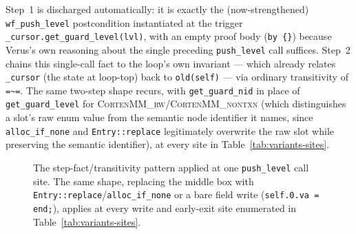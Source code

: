 \documentclass[10pt]{article}
\newcommand{\corten}[1]{\textsc{CortenMM\_#1}}
\newcommand{\vfn}[1]{\texttt{#1}}
\begin{document}
Step~1 is discharged automatically: it is exactly the (now-strengthened)
\vfn{wf\_push\_level} postcondition instantiated at the trigger
\vfn{\_cursor.get\_guard\_level(lvl)}, with an empty proof body (\texttt{by \{\}})
because Verus's own reasoning about the single preceding
\vfn{push\_level} call suffices. Step~2 chains this single-call fact to
the loop's own invariant --- which already relates \vfn{\_cursor} (the
state at loop-top) back to \vfn{old(self)} --- via ordinary
transitivity of \lstinline[style=verus]{=~=}. The same two-step shape recurs, with
\vfn{get\_guard\_nid} in place of \vfn{get\_guard\_level} for
\corten{rw}/\corten{nontxn} (which distinguishes a slot's raw enum
value from the semantic node identifier it names, since
\vfn{alloc\_if\_none} and \vfn{Entry::replace} legitimately overwrite
the raw slot while preserving the semantic identifier), at every site
in Table~\ref{tab:variants-sites}.

\begin{figure}[h]
\centering
{}
\caption{The step-fact/transitivity pattern applied at one
\vfn{push\_level} call site. The same shape, replacing the middle box
with \vfn{Entry::replace}/\vfn{alloc\_if\_none} or a bare field write
(\lstinline[style=verus]{self.0.va = end;}), applies at every write and
early-exit site enumerated in Table~\ref{tab:variants-sites}.}
\label{fig:pattern}
\end{figure}
\end{document}
